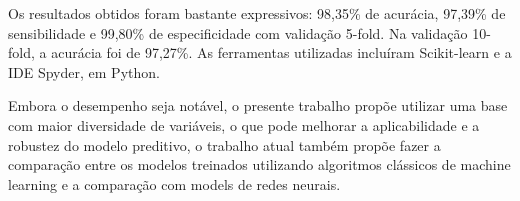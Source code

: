 Os resultados obtidos foram bastante expressivos: 98,35\% de acurácia, 97,39\% de sensibilidade e 99,80\% de especificidade com validação 5-fold. Na validação 10-fold, a acurácia foi de 97,27\%. As ferramentas utilizadas incluíram Scikit-learn e a IDE Spyder, em Python.

Embora o desempenho seja notável, o presente trabalho propõe utilizar uma base com maior diversidade de variáveis, o que pode melhorar a aplicabilidade e a robustez do modelo preditivo, o trabalho atual também propõe fazer a comparação entre os modelos treinados utilizando algoritmos clássicos de machine learning e a comparação com models de redes neurais.